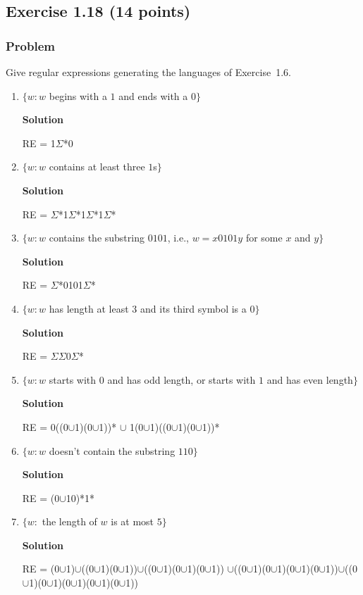 \documentclass{article}
\begin{document}
\begin{empfile}
\subsection*{Exercise 1.18 (14 points)}

\subsubsection*{Problem}

Give regular expressions generating the languages of Exercise~1.6.

\begin{enumerate}[\bfseries a.]
\item $\{w: w$ begins with a $1$ and ends with a $0\}$

\textbf{Solution}

RE = 1$\Sigma$*0

\item $\{w: w$ contains at least three $1$s$\}$

\textbf{Solution}

RE = $\Sigma$*1$\Sigma$*1$\Sigma$*1$\Sigma$*

\item $\{w: w$ contains the substring $0101$, i.e., $w=x0101y$ for
some $x$ and $y\}$

\textbf{Solution}

RE = $\Sigma$*0101$\Sigma$*

\item $\{w: w$ has length at least $3$ and its third symbol is a $0\}$

\textbf{Solution}

RE = $\Sigma$$\Sigma$0$\Sigma$*

\item $\{w: w$ starts with $0$ and has odd length, or starts with
$1$ and has even length$\}$

\textbf{Solution}

RE = 0((0$\cup$1)(0$\cup$1))* $\cup$ 1(0$\cup$1)((0$\cup$1)(0$\cup$1))*

\item $\{w: w$ doesn't contain the substring $110\}$

\textbf{Solution}

RE = (0$\cup$10)*1*

\item $\{w:$ the length of $w$ is at most $5\}$

\textbf{Solution}

RE = (0$\cup$1)$\cup$((0$\cup$1)(0$\cup$1))$\cup$((0$\cup$1)(0$\cup$1)(0$\cup$1))
$\cup$((0$\cup$1)(0$\cup$1)(0$\cup$1)(0$\cup$1))$\cup$((0$\cup$1)(0$\cup$1)(0$\cup$1)(0$\cup$1)(0$\cup$1))


\end{enumerate}
\end{empfile}
\end{document}
